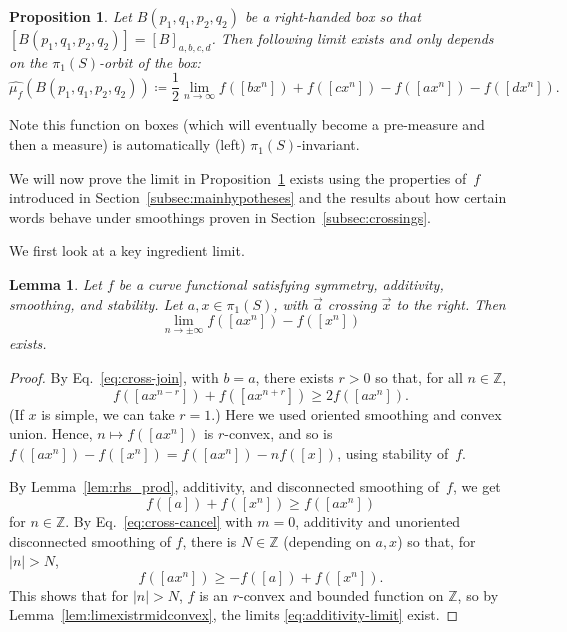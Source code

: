 \documentclass[11pt]{amsart}
\newcommand{\ora}[1]{\overrightarrow{#1}}
\numberwithin{equation}{section}
\numberwithin{figure}{section}
\newtheorem{lemma}[theorem]{Lemma}
\newtheorem{proposition}[theorem]{Proposition}
\theoremstyle{definition}
\theoremstyle{plain}
\newcommand*{\wh}[1]{\widehat{#1}}
\begin{document}
\begin{proposition}
\label{prop:limitexists}
Let $B(p_1,q_1,p_2,q_2)$ be a right-handed box so that $[B(p_1,q_1,p_2,q_2)]=[B]_{a,b,c,d}$.
Then following limit exists and only depends on the $\pi_1(S)$-orbit
of the box:
\begin{equation}
\wh{\mu_{f}}(B(p_1,q_1,p_2,q_2))\coloneqq\frac{1}{2}\lim_{n \to \infty}f([bx^n]) + f([cx^n])-f([ax^n]) - f([dx^n]).
\label{eq:def_measure}
\end{equation}
\end{proposition}
Note this function on boxes (which will eventually become a pre-measure and
then a measure) is automatically (left) $\pi_1(S)$-invariant.

We will now prove the limit in Proposition~\ref{prop:limitexists} exists using the properties
of~$f$ introduced in Section~\ref{subsec:mainhypotheses} and the
results about how certain words behave under smoothings proven in
Section~\ref{subsec:crossings}. 

We
first look at a key ingredient limit.

\begin{lemma}\label{lem:additivity-limit}
Let $f$ be a curve functional satisfying symmetry, additivity, smoothing, and
stability.
Let $a,x \in \pi_1(S)$, with $\ora{a}$ crossing $\ora{x}$ to the right. Then
  \begin{equation}\label{eq:additivity-limit}
    \lim_{n \to \pm\infty} f([a x^{n}]) - f([x^n])
  \end{equation}
  exists.
\end{lemma}

\begin{proof}
  By Eq.~\eqref{eq:cross-join}, with $b=a$, there exists $r>0$ so
  that, for all $n \in \mathbb{Z}$,
  \[
    f([ax^{n-r}]) + f([ax^{n+r}]) \geq 2 f([ax^n]).
  \]
  (If $x$ is simple, we can take $r=1$.) Here we used oriented smoothing and
  convex union. 
  Hence, $n \mapsto f([a x^{n}])$ is $r$-convex, and so is $f([a x^{n}]) - f([x^{n}]) = f([a x^{n}]) -
  nf([x])$, using stability of~$f$.
 
  By Lemma~\ref{lem:rhs_prod}, additivity, and 
 disconnected smoothing of~$f$, we get
 \[
 f([a]) + f([x^{n}]) \geq f([ax^{n}])
 \]
 for $n \in \mathbb{Z}$.
 By Eq.~\eqref{eq:cross-cancel} with $m=0$,
additivity and unoriented disconnected
smoothing of $f$, there is $N \in \mathbb{Z}$ (depending on $a,x$) so that, for $|n| > N$,
  \[
    f([a x^{n}]) \ge -f([a]) + f([x^{ n}]).
  \] 
  This shows that for $|n| > N$, $f$ is an $r$-convex and
  bounded function on $\mathbb{Z}$, so by Lemma~\ref{lem:limexistrmidconvex}, the
  limits \eqref{eq:additivity-limit} exist.
\end{proof}
\end{document}
